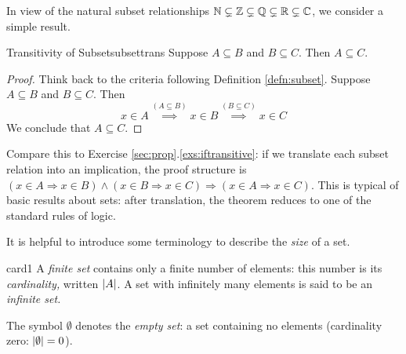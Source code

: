\goodbreak

In view of the natural subset relationships $\mathbb{N}\subsetneq\mathbb{Z}\subsetneq\mathbb{Q}\subsetneq\mathbb{R}\subsetneq\mathbb{C}$, we consider a simple result.

\begin{lemm}{Transitivity of Subset}{subsettrans}
	Suppose $A\subseteq B$ and $B\subseteq C$. Then $A\subseteq C$.
\end{lemm}

\begin{proof}
	Think back to the criteria following Definition \ref{defn:subset}. Suppose $A\subseteq B$ and $B\subseteq C$. Then
	\[
		x\in A \overset{(A\subseteq B)}{\implies} x\in B\overset{(B\subseteq C)}{\implies} x\in C
	\]
	We conclude that $A\subseteq C$.
\end{proof}

Compare this to Exercise \ref*{sec:prop}.\ref{exs:iftransitive}: if we translate each subset relation into an implication, the proof structure is $(x\in A\Rightarrow x\in B)\wedge (x\in B\Rightarrow x\in C)\Longrightarrow (x\in A\Rightarrow x\in C)$. This is typical of basic results about sets: after translation, the theorem reduces to one of the standard rules of logic.




It is helpful to introduce some terminology to describe the \emph{size} of a set.

\begin{defn}{}{card1}
	A \emph{finite set} contains only a finite number of elements: this number is its \emph{cardinality,} written $\left| A\right|$. A set with infinitely many elements is said to be an \emph{infinite set.}\par
	The symbol $\emptyset$ denotes the \emph{empty set}: a set containing no elements (cardinality zero: $\left| \emptyset\right|=0$).
\end{defn}



